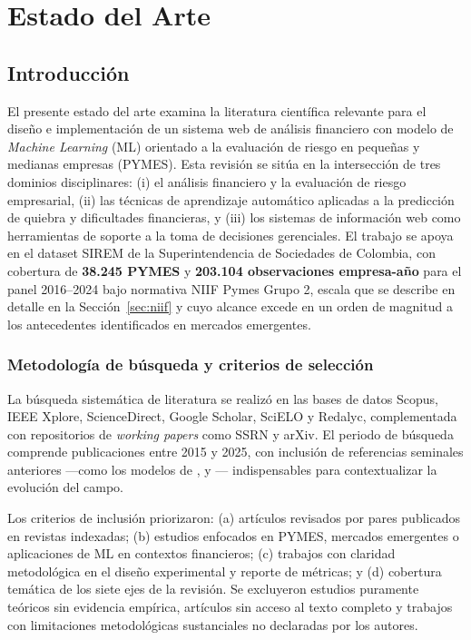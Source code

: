 \documentclass[12pt, letterpaper]{article}
\begin{document}
\section{Estado del Arte}

\subsection{Introducci\'on}

El presente estado del arte examina la literatura cient\'ifica relevante para el dise\~no e implementaci\'on de un sistema web de an\'alisis financiero con modelo de \textit{Machine Learning} (ML) orientado a la evaluaci\'on de riesgo en peque\~nas y medianas empresas (PYMES). Esta revisi\'on se sit\'ua en la intersecci\'on de tres dominios disciplinares: (i) el an\'alisis financiero y la evaluaci\'on de riesgo empresarial, (ii) las t\'ecnicas de aprendizaje autom\'atico aplicadas a la predicci\'on de quiebra y dificultades financieras, y (iii) los sistemas de informaci\'on web como herramientas de soporte a la toma de decisiones gerenciales. El trabajo se apoya en el dataset SIREM de la Superintendencia de Sociedades de Colombia, con cobertura de \textbf{38.245 PYMES} y \textbf{203.104 observaciones empresa-a\~no} para el panel 2016--2024 bajo normativa NIIF Pymes Grupo 2, escala que se describe en detalle en la Secci\'on~\ref{sec:niif} y cuyo alcance excede en un orden de magnitud a los antecedentes identificados en mercados emergentes.

\subsubsection*{Metodolog\'ia de b\'usqueda y criterios de selecci\'on}

La b\'usqueda sistem\'atica de literatura se realiz\'o en las bases de datos Scopus, IEEE Xplore, ScienceDirect, Google Scholar, SciELO y Redalyc, complementada con repositorios de \textit{working papers} como SSRN y arXiv. El periodo de b\'usqueda comprende publicaciones entre 2015 y 2025, con inclusi\'on de referencias seminales anteriores ---como los modelos de \citet{Altman1968}, \citet{Ohlson1980} y \citet{Zmijewski1984}--- indispensables para contextualizar la evoluci\'on del campo.

Los criterios de inclusi\'on priorizaron: (a) art\'iculos revisados por pares publicados en revistas indexadas; (b) estudios enfocados en PYMES, mercados emergentes o aplicaciones de ML en contextos financieros; (c) trabajos con claridad metodol\'ogica en el dise\~no experimental y reporte de m\'etricas; y (d) cobertura tem\'atica de los siete ejes de la revisi\'on. Se excluyeron estudios puramente te\'oricos sin evidencia emp\'irica, art\'iculos sin acceso al texto completo y trabajos con limitaciones metodol\'ogicas sustanciales no declaradas por los autores.
\end{document}
